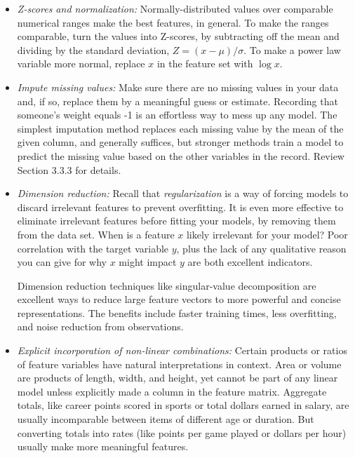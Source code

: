 \documentclass[10pt]{article}
\begin{document}
\begin{enumerate}
\begin{itemize}
  \item \textit{Z-scores and normalization:} Normally-distributed values over comparable numerical ranges make the best features, in general. To make the ranges comparable, turn the values into Z-scores, by subtracting off the mean and dividing by the standard deviation, $Z = (x-\mu)/\sigma$. To make a power law variable more normal, replace $x$ in the feature set with $\log x$.
  \item \textit{Impute missing values:} Make sure there are no missing values in your data and, if so, replace them by a meaningful guess or estimate. Recording that someone's weight equals -1 is an effortless way to mess up any model. The simplest imputation method replaces each missing value by the mean of the given column, and generally suffices, but stronger methods train a model to predict the missing value based on the other variables in the record. Review Section 3.3.3 for details.
  \item \textit{Dimension reduction:} Recall that \textit{regularization} is a way of forcing models to discard irrelevant features to prevent overfitting. It is even more effective to eliminate irrelevant features before fitting your models, by removing them from the data set. When is a feature $x$ likely irrelevant for your model? Poor correlation with the target variable $y$, plus the lack of any qualitative reason you can give for why $x$ might impact $y$ are both excellent indicators.
  
  Dimension reduction techniques like singular-value decomposition are excellent ways to reduce large feature vectors to more powerful and concise representations. The benefits include faster training times, less overfitting, and noise reduction from observations.

  \item \textit{Explicit incorporation of non-linear combinations:} Certain products or ratios of feature variables have natural interpretations in context. Area or volume are products of length, width, and height, yet cannot be part of any linear model unless explicitly made a column in the feature matrix. Aggregate totals, like career points scored in sports or total dollars earned in salary, are usually incomparable between items of different age or duration. But converting totals into rates (like points per game played or dollars per hour) usually make more meaningful features.
\end{itemize}


\end{enumerate}
\end{document}
